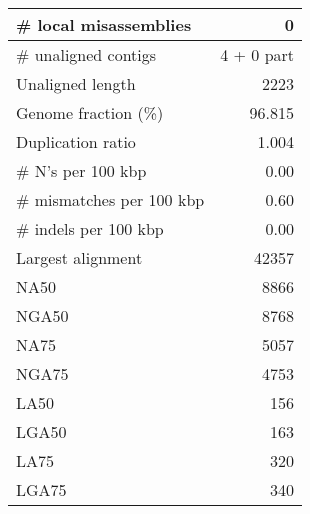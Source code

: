 \documentclass[12pt,a4paper]{article}
\begin{document}
\begin{table}[ht]
\begin{center}
\begin{tabular}{|l*{1}{|r}|}
\# local misassemblies & 0 \\ \hline
\# unaligned contigs & 4 + 0 part \\ \hline
Unaligned length & 2223 \\ \hline
Genome fraction (\%) & 96.815 \\ \hline
Duplication ratio & 1.004 \\ \hline
\# N's per 100 kbp & 0.00 \\ \hline
\# mismatches per 100 kbp & 0.60 \\ \hline
\# indels per 100 kbp & 0.00 \\ \hline
Largest alignment & 42357 \\ \hline
NA50 & 8866 \\ \hline
NGA50 & 8768 \\ \hline
NA75 & 5057 \\ \hline
NGA75 & 4753 \\ \hline
LA50 & 156 \\ \hline
LGA50 & 163 \\ \hline
LA75 & 320 \\ \hline
LGA75 & 340 \\ \hline
\end{tabular}
\end{center}
\end{table}
\end{document}

